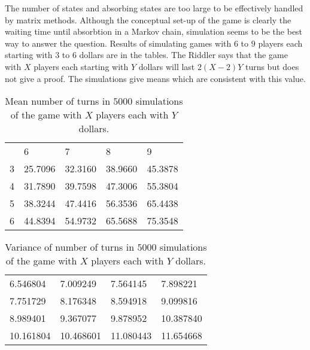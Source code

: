 \begin{example}
  The number of states and absorbing states are too large to be
  effectively handled by matrix methods.  Although the conceptual
  set-up of the game is clearly the waiting time until absorbtion in a
  Markov chain, simulation seems to be the best way to answer the
  question.  Results of simulating games with $6$ to $9$ players each
  starting with $3$ to $6$ dollars are in the tables.  The Riddler
  says that the game with $X$ players each starting with $Y$ dollars
  will last $2(X-2)Y$ turns but does not give a proof.
  The simulations give means which are consistent with this value.
  \begin{table}
    \centering
    \begin{tabular}{l | llll}
      &  6       & 7       & 8       & 9      \\
     3 &  25.7096 & 32.3160 & 38.9660 & 45.3878 \\
     4 &  31.7890 & 39.7598 & 47.3006 & 55.3804 \\
     5 &  38.3244 & 47.4416 & 56.3536 & 65.4438 \\
     6 &  44.8394 & 54.9732 & 65.5688 & 75.3548
    \end{tabular}
    \caption{Mean number of turns in $5000$ simulations of the game
      with $X$ players each with $Y$ dollars.}
    \label{tab:waitingtimeabsorbtion:lcrmean}
  \end{table}

  \begin{table}
    \centering
    \begin{tabular}{llll}
       6.546804 &  7.009249 &  7.564145 &  7.898221 \\
       7.751729 &  8.176348 &  8.594918 &  9.099816 \\
       8.989401 &  9.367077 &  9.878952 & 10.387840 \\
      10.161804 & 10.468601 & 11.080443 & 11.654668
\end{tabular}
    \caption{Variance of number of turns in $5000$ simulations of the game
      with $X$ players each with $Y$ dollars.}
    \label{tab:waitingtimeabsorbtion:lcrmean}
  \end{table}





\end{example}
